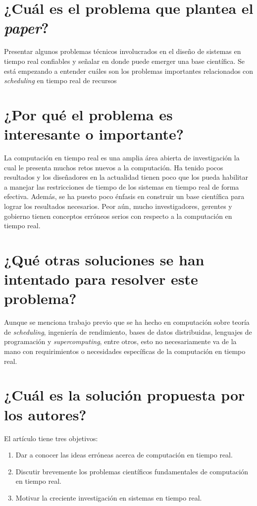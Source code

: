 \section{¿Cuál es el problema que plantea el \textit{paper}?}
Presentar algunos problemas técnicos involucrados en el diseño de sistemas en tiempo real confiables y señalar en donde puede emerger una base científica. Se está empezando a entender cuáles son los problemas importantes relacionados con \emph{scheduling} en tiempo real de recursos

\section{¿Por qué el problema es interesante o importante?}
La computación en tiempo real es una amplia área abierta de investigación la cual le presenta muchos retos nuevos a la computación. Ha tenido pocos resultados y los diseñadores en la actualidad tienen poco que los pueda habilitar a manejar las restricciones de tiempo de los sistemas en tiempo real de forma efectiva. Además, se ha puesto poco énfasis en construir un base científica para lograr los resultados necesarios. Peor aún, mucho investigadores, gerentes y gobierno tienen conceptos erróneos serios con respecto a la computación en tiempo real.

\section{¿Qué otras soluciones se han intentado para resolver este problema?}
Aunque se menciona trabajo previo que se ha hecho en computación sobre teoría de \emph{scheduling}, ingeniería de rendimiento, bases de datos distribuidas, lenguajes de programación y \emph{supercomputing}, entre otros, esto no necesariamente va de la mano con requirimientos o necesidades específicas de la computación en tiempo real. 
     
\section{¿Cuál es la solución propuesta por los autores?}
El artículo tiene tres objetivos:
\begin{enumerate}
    \item Dar a conocer las ideas erróneas acerca de computación en tiempo real.
    \item Discutir brevemente los problemas científicos fundamentales de computación en tiempo real.
    \item Motivar la creciente investigación en sistemas en tiempo real.
\end{enumerate}


